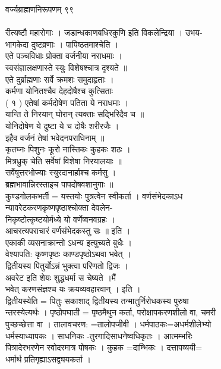 \documentclass[11pt, openany]{book}
\begin{document}
{{{{{{{{{{{{ वर्ज्यब्राह्मणनिरूपणम् \textbar{} ९९\\
~\\
रीत्यष्टौ महारोगाः । जडान्धकाणबधिरकुणि इति विकलेन्द्रिया । उभय-\\
भागकेदा दुष्टव्रणाः । पापिष्ठतमाश्चेति ।\\
एते पञ्चविधाः प्रोक्ता वर्जनीया नराधमाः ।\\
स्वसंज्ञालक्षणास्ते स्युः विशेषश्चात्र दृश्यते ॥\\
एते दुर्ब्राह्मणाः सर्वे क्रमशः समुदाहृताः ।\\
कर्मणा योनितश्चैव देहदोषैश्च कुत्सिताः \textbar{}\textbar{}\\
( १ ) एतेषां कर्मदोषेण पतिता ये नराधमाः ।\\
यान्ति ते निरयान् घोरान् त्यक्ताः सद्भिरिदैव च ॥\\
योनिदोषेण ये दुष्टा ये च दोषैः शरीरजैः ।\\
इहैव वर्जनं तेषां भवेदनपराधिनाम् ॥\\
कृतघ्नः पिशुनः कूरो नास्तिकः कुहकः शठः ।\\
मित्रध्रुक् चेति सर्वेषां विशेषा निरयालयाः ॥\\
सर्वेषूत्तरभोज्याः स्युरदानार्हाश्च कर्मसु ।\\
ब्रह्मभावान्निरस्ताइच पापदोषवशानुगाः ॥\\
कुण्डगोलकभर्ती = यस्तयोः पुत्रत्वेन स्वीकर्ता । वर्णसंभेदकाऽध\\
न्यावरेटकरणकृष्णपृष्ठाश्चोक्ता देवलेन-\\
निकृष्टोत्कृष्टयोर्मध्ये यो वर्णेष्वनवग्रहः ।\\
आचरत्यपराचारं वर्णसंभेदकस्तु सः ॥ इति ।\\
एकाकी व्यसनाक्रान्तो ऽधन्य इत्युच्यते बुधैः ।\\
वेश्यापति: कृष्णपृष्ठः काण्डपृष्ठोऽथवा भवेत् ।\\
द्वितीयस्य पितुर्योऽन्नं भुक्त्वा परिणतो द्विजः ।\\
अवरेट इति शेयः शुद्धधर्मा स चेष्यते ।मैं\\
भवेत् करणसंज्ञश्च यः क्रयव्यवहारवान् । इति ।\\
द्वितीयस्येति = पितुः सकाशाद् द्वितीयस्य तन्मातुर्निरोधकस्य पुरुषा\\
न्तरस्येत्यर्थः । पृष्ठोपघाती = पृष्ठमैथुन कर्ता, परोक्षापकरणशीलो वा,
चमरी\\
पुच्छच्छेत्ता वा । तालावचरण: =तालोपजीवी । धर्मपाठकः=अधर्मशीलेभ्यो\\
धर्मस्याध्यापकः । साधनिकः -तुरगादिसाधनेष्वधिकृतः । आत्मम्भरिः\\
पित्रादेरभरणेन स्वोदरमात्र पोषकः । कुहक =दाम्भिकः । दत्तापव्ययी=\\
धर्मार्थ प्रतिगृह्याऽसद्व्ययकर्ता ।

}}}}}}}}}}}}
\end{document}
